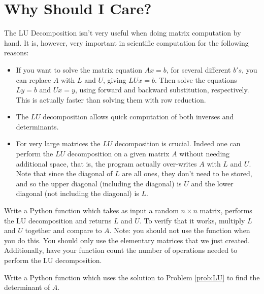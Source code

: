 \section*{Why Should I Care?}

The LU Decomposition isn't very useful when doing matrix computation by hand.
It is, however, very important in scientific computation for the following reasons:
\begin{itemize}
\item If you want to solve the matrix equation $A x = b$, for several different $b's$, you can replace $A$ with $L$ and $U$, giving $L U x = b$.
Then solve the equations $L y = b$ and $U x = y$, using forward and backward substitution, respectively.
This is actually faster than solving them with row reduction.
\item The $LU$ decomposition allows quick computation of both inverses and determinants.
\item For very large matrices the $LU$ decomposition is crucial.
Indeed one can perform the $LU$ decomposition on a given matrix $A$ without needing additional space, that is, the program actually over-writes $A$ with $L$ and $U$.
Note that since the diagonal of $L$ are all ones, they don't need to be stored, and so the upper diagonal (including the diagonal) is $U$ and the lower diagonal (not including the diagonal) is $L$.
\end{itemize}

\begin{problem}
\label{prob:LU}
Write a Python function which takes as input a random $n\times n$ matrix, performs the LU decomposition and returns $L$ and $U$.
To verify that it works, multiply $L$ and $U$ together and compare to $A$.
Note: you should not use the  function when you do this.
You should only use the elementary matrices that we just created.
Additionally, have your function count the number of operations needed to perform the LU decomposition.
\end{problem}

\begin{problem}
\label{prob:det}
Write a Python function which uses the solution to Problem \ref{prob:LU} to find the determinant of $A$.
\end{problem}
